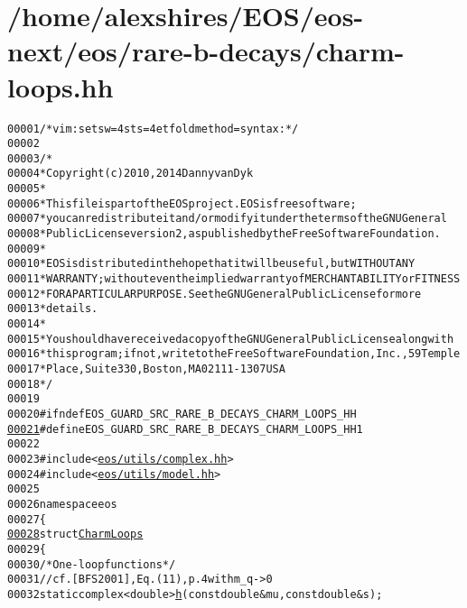 \hypertarget{charm-loops_8hh_source}{
\section{/home/alexshires/EOS/eos-\/next/eos/rare-\/b-\/decays/charm-\/loops.hh}
}


\begin{footnotesize}\begin{alltt}
00001 \textcolor{comment}{/* vim: set sw=4 sts=4 et foldmethod=syntax : */}
00002 
00003 \textcolor{comment}{/*}
00004 \textcolor{comment}{ * Copyright (c) 2010, 2014 Danny van Dyk}
00005 \textcolor{comment}{ *}
00006 \textcolor{comment}{ * This file is part of the EOS project. EOS is free software;}
00007 \textcolor{comment}{ * you can redistribute it and/or modify it under the terms of the GNU General}
00008 \textcolor{comment}{ * Public License version 2, as published by the Free Software Foundation.}
00009 \textcolor{comment}{ *}
00010 \textcolor{comment}{ * EOS is distributed in the hope that it will be useful, but WITHOUT ANY}
00011 \textcolor{comment}{ * WARRANTY; without even the implied warranty of MERCHANTABILITY or FITNESS}
00012 \textcolor{comment}{ * FOR A PARTICULAR PURPOSE.  See the GNU General Public License for more}
00013 \textcolor{comment}{ * details.}
00014 \textcolor{comment}{ *}
00015 \textcolor{comment}{ * You should have received a copy of the GNU General Public License along with}
00016 \textcolor{comment}{ * this program; if not, write to the Free Software Foundation, Inc., 59 Temple}
00017 \textcolor{comment}{ * Place, Suite 330, Boston, MA  02111-1307  USA}
00018 \textcolor{comment}{ */}
00019 
00020 \textcolor{preprocessor}{#ifndef EOS\_GUARD\_SRC\_RARE\_B\_DECAYS\_CHARM\_LOOPS\_HH}
\hypertarget{charm-loops_8hh_source_l00021}{}\hyperlink{charm-loops_8hh_a69bd0fff42281bb2678a5822db3b6f8c}{00021} \textcolor{preprocessor}{}\textcolor{preprocessor}{#define EOS\_GUARD\_SRC\_RARE\_B\_DECAYS\_CHARM\_LOOPS\_HH 1}
00022 \textcolor{preprocessor}{}
00023 \textcolor{preprocessor}{#include <\hyperlink{complex_8hh}{eos/utils/complex.hh}>}
00024 \textcolor{preprocessor}{#include <\hyperlink{model_8hh}{eos/utils/model.hh}>}
00025 
00026 \textcolor{keyword}{namespace }eos
00027 \{
\hypertarget{charm-loops_8hh_source_l00028}{}\hyperlink{structeos_1_1CharmLoops}{00028}     \textcolor{keyword}{struct }\hyperlink{structeos_1_1CharmLoops}{CharmLoops}
00029     \{
00030         \textcolor{comment}{/* One-loop functions */}
00031         \textcolor{comment}{// cf. [BFS2001], Eq. (11), p. 4 with m\_q -> 0}
00032         \textcolor{keyword}{static} complex<double> \hyperlink{structeos_1_1CharmLoops_a2b0657d433f9e17904202a5309d3a4a2}{h}(\textcolor{keyword}{const} \textcolor{keywordtype}{double} & mu, \textcolor{keyword}{const} \textcolor{keywordtype}{double} & s);

\end{alltt}
\end{footnotesize}
